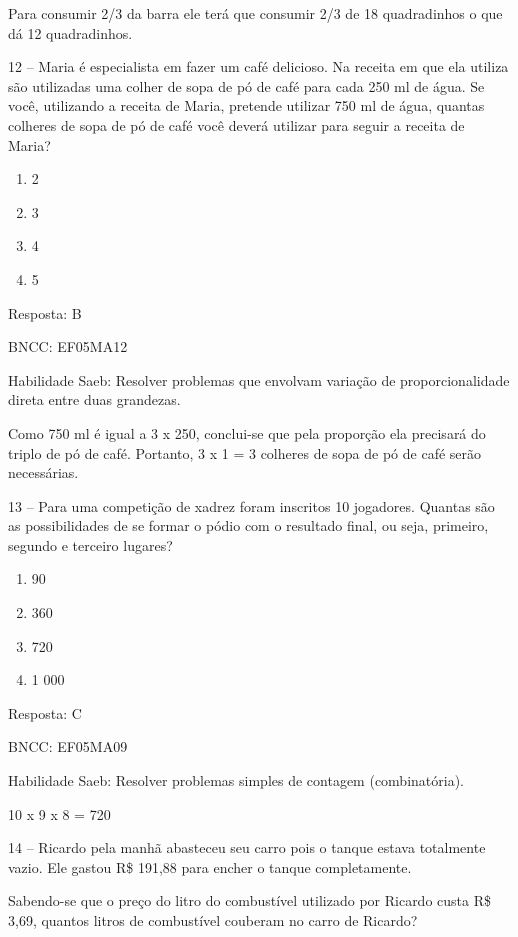 Para consumir 2/3 da barra ele terá que consumir 2/3 de 18 quadradinhos
o que dá 12 quadradinhos.

12 -- Maria é especialista em fazer um café delicioso. Na receita em que
ela utiliza são utilizadas uma colher de sopa de pó de café para cada
250 ml de água. Se você, utilizando a receita de Maria, pretende
utilizar 750 ml de água, quantas colheres de sopa de pó de café você
deverá utilizar para seguir a receita de Maria?

\begin{enumerate}
\def\labelenumi{\alph{enumi})}
\item
  2
\item
  3
\item
  4
\item
  5
\end{enumerate}

Resposta: B

BNCC: EF05MA12

Habilidade Saeb: Resolver problemas que envolvam variação de
proporcionalidade direta entre duas grandezas.

Como 750 ml é igual a 3 x 250, conclui-se que pela proporção ela
precisará do triplo de pó de café. Portanto, 3 x 1 = 3 colheres de sopa
de pó de café serão necessárias.

13 -- Para uma competição de xadrez foram inscritos 10 jogadores.
Quantas são as possibilidades de se formar o pódio com o resultado
final, ou seja, primeiro, segundo e terceiro lugares?

\begin{enumerate}
\def\labelenumi{\alph{enumi})}
\item
  90
\item
  360
\item
  720
\item
  1 000
\end{enumerate}

Resposta: C

BNCC: EF05MA09

Habilidade Saeb: Resolver problemas simples de contagem (combinatória).

10 x 9 x 8 = 720

14 -- Ricardo pela manhã abasteceu seu carro pois o tanque estava
totalmente vazio. Ele gastou R\$ 191,88 para encher o tanque
completamente.

Sabendo-se que o preço do litro do combustível utilizado por Ricardo
custa R\$ 3,69, quantos litros de combustível couberam no carro de
Ricardo?

